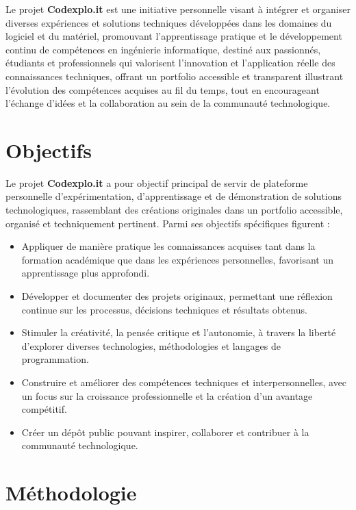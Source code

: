 \documentclass[10pt, a4paper, oneside]{article}
\begin{document}
Le projet \textbf{Codexplo.it} est une initiative personnelle visant à intégrer et organiser diverses expériences et solutions techniques développées dans les domaines du logiciel et du matériel, promouvant l’apprentissage pratique et le développement continu de compétences en ingénierie informatique, destiné aux passionnés, étudiants et professionnels qui valorisent l’innovation et l’application réelle des connaissances techniques, offrant un portfolio accessible et transparent illustrant l’évolution des compétences acquises au fil du temps, tout en encourageant l’échange d’idées et la collaboration au sein de la communauté technologique.

\section{Objectifs}

Le projet \textbf{Codexplo.it} a pour objectif principal de servir de plateforme personnelle d’expérimentation, d’apprentissage et de démonstration de solutions technologiques, rassemblant des créations originales dans un portfolio accessible, organisé et techniquement pertinent. Parmi ses objectifs spécifiques figurent :

\begin{itemize}
  \item Appliquer de manière pratique les connaissances acquises tant dans la formation académique que dans les expériences personnelles, favorisant un apprentissage plus approfondi.
  \item Développer et documenter des projets originaux, permettant une réflexion continue sur les processus, décisions techniques et résultats obtenus.
  \item Stimuler la créativité, la pensée critique et l’autonomie, à travers la liberté d’explorer diverses technologies, méthodologies et langages de programmation.
  \item Construire et améliorer des compétences techniques et interpersonnelles, avec un focus sur la croissance professionnelle et la création d’un avantage compétitif.
  \item Créer un dépôt public pouvant inspirer, collaborer et contribuer à la communauté technologique.\newpage
\end{itemize}

\section{Méthodologie}
\end{document}
